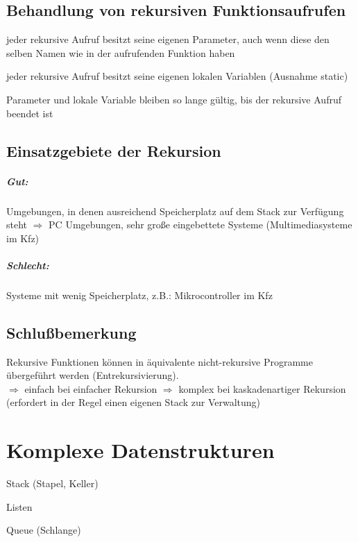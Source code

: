 \section{Behandlung von rekursiven Funktionsaufrufen}
\begin{compactitem}
	\item jeder rekursive Aufruf besitzt seine eigenen Parameter, auch wenn diese den selben Namen wie in der aufrufenden Funktion haben
	\item jeder rekursive Aufruf besitzt seine eigenen lokalen Variablen (Ausnahme static)
	\item Parameter und lokale Variable bleiben so lange gültig, bis der rekursive Aufruf beendet ist
\end{compactitem}

\section{Einsatzgebiete der Rekursion}
\paragraph{Gut:} Umgebungen, in denen ausreichend Speicherplatz auf dem Stack zur Verfügung steht $\Rightarrow$ PC Umgebungen, {\flqq sehr große\frqq} eingebettete Systeme (Multimediasysteme im Kfz)
\paragraph{Schlecht:} Systeme mit {\flqq wenig\frqq} Speicherplatz, z.B.: Mikrocontroller im Kfz

\section{Schlußbemerkung}
Rekursive Funktionen können in äquivalente nicht-rekursive Programme übergeführt werden ({\flqq Entrekursivierung\frqq}).\\
$\Rightarrow$ einfach bei einfacher Rekursion
$\Rightarrow$ komplex bei kaskadenartiger Rekursion (erfordert in der Regel einen eigenen Stack zur Verwaltung)

\chapter{Komplexe Datenstrukturen}
\begin{compactitem}
	\item Stack (Stapel, Keller)
	\item Listen
	\item Queue (Schlange)
\end{compactitem}


